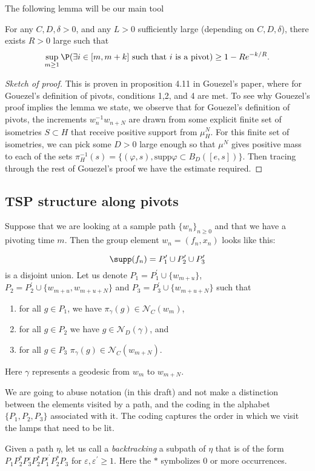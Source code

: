 The following lemma will be our main tool

\begin{lem}
    For any $C, D, \delta>0$, and any $L>0$ sufficiently large (depending on $C,D,\delta$), there exists $R>0$ large such that 
    \[
    \sup_{m\ge 1}\P(\exists i\in [m,m+k]\text{ such that }i\text{ is a pivot})\ge 1-Re^{-k/R}.
    \]
    \end{lem}
    \begin{proof}[Sketch of proof]
	This is proven in proposition 4.11 in Gouezel's paper, where for Gouezel's definition of pivots, conditions 1,2, and 4 are met. To see why Gouezel's proof implies the lemma we state, we observe that for Gouezel's definition of pivots, the increments $ w _{n} ^{-1} w _{n+N} $ are drawn from some explicit finite set of isometries $ S \subset H $ that receive positive support from $ \mu_{H} ^{N} $. For this finite set of isometries, we can pick some $ D>0 $ large enough so that $ \mu ^{N} $ gives positive mass to each of the sets $ \pi _{H} ^{-1} (s) = \{(\varphi, s), \text{supp} \varphi \subset B _{D} ([e,s])\}$. Then tracing through the rest of Gouezel's proof we have the estimate required. 
\end{proof}

\subsection{TSP structure along pivots}

Suppose that we are looking at a sample path $\{w_n\}_{n\ge 0}$ and that we have a pivoting time $m$. Then the group element $w_n=(f_n,x_n)$ looks like this:

\[\supp(f_n)=P^{\prime}_1\cup P^{\prime}_2\cup P^{\prime}_3\]
is a disjoint union. Let us denote $P_1=P^{\prime}_1\cup\{w_{m+u}\}$, $P_2=P^{\prime}_2\cup \{w_{m+u}, w_{m+u+N}\}$ and  $P_3=P^{\prime}_3\cup \{w_{m+u+N}\}$  such that
\begin{enumerate}
    \item for all $g\in P_1$, we have $\pi_{\gamma}(g)\in \mathcal{N}_{C}(w_m)$,
    \item for all $g\in P_2$ we have $g\in \mathcal{N}_{D}(\gamma)$, and
    \item for all $g\in P_3$ $\pi_{\gamma}(g)\in \mathcal{N}_{C}(w_{m+N})$.
\end{enumerate}
Here $\gamma$ represents a geodesic from $w_m$ to $w_{m+N}$.

We are going to abuse notation (in this draft) and not make a distinction between the elements visited by a path, and the coding in the alphabet $\{P_1,P_2,P_3\}$ associated with it. The coding captures the order in which we visit the lamps that need to be lit.
\begin{defin}
Given a path $\eta$, let us call a \emph{backtracking} a subpath of $\eta$ that is of the form $P_1P_2^{*}P_3^{\varepsilon}P_2^{*}P_1^{\varepsilon^{\prime}}P_2^{*}P_3$ for $\varepsilon, \varepsilon^{\prime}\ge 1$. Here the $*$ symbolizes $0$ or more occurrences.
\end{defin}

